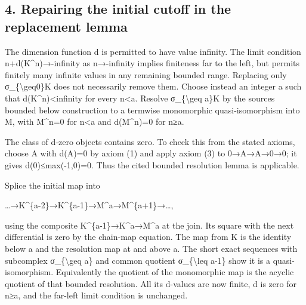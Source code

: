 \subsection{4. Repairing the initial cutoff in the replacement lemma}\label{proofs-9746-10132-repairing-the-initial-cutoff-in-the-replacement-lemma}

The dimension function d is permitted to have value infinity. The limit condition n\allowbreak{}+d(K\textasciicircum{}n)\allowbreak{}\allowbreak{}→-infinity as n\allowbreak{}→-infinity implies finiteness far to the left,\allowbreak{} but permits finitely many infinite values in any remaining bounded range. Replacing only σ\_\allowbreak{}\{\textbackslash{}geq0\}K does not necessarily remove them. Choose instead an integer a such that d(K\textasciicircum{}n)\allowbreak{}<infinity for every n\textless a. Resolve σ\_\allowbreak{}\{\textbackslash{}geq a\}K by the source\textquotesingle s bounded below construction to a termwise monomorphic quasi-isomorphism into M,\allowbreak{} with M\textasciicircum{}n\allowbreak{}=0 for n\textless a and d(M\textasciicircum{}n)\allowbreak{}\allowbreak{}=0 for n≥a.

The class of d-zero objects contains zero. To check this from the stated axioms,\allowbreak{} choose A with d(A)\allowbreak{}\allowbreak{}=0 by axiom (1)\allowbreak{} and apply axiom (3)\allowbreak{} to 0\allowbreak{}→A\allowbreak{}→A\allowbreak{}→0\allowbreak{}→0; it gives d(0)\allowbreak{}≤max(-1,\allowbreak{}0)\allowbreak{}\allowbreak{}=0. Thus the cited bounded resolution lemma is applicable.

Splice the initial map into

…\allowbreak{}→K\textasciicircum{}\{a-2\}\allowbreak{}→K\textasciicircum{}\{a-1\}\allowbreak{}→M\textasciicircum{}a\allowbreak{}→M\textasciicircum{}\{a\allowbreak{}+1\}\allowbreak{}→…,\allowbreak{}

using the composite K\textasciicircum{}\{a-1\}\allowbreak{}→K\textasciicircum{}a\allowbreak{}→M\textasciicircum{}a at the join. Its square with the next differential is zero by the chain-map equation. The map from K is the identity below a and the resolution map at and above a. The short exact sequences with subcomplex σ\_\allowbreak{}\{\textbackslash{}geq a\} and common quotient σ\_\allowbreak{}\{\textbackslash{}leq a-1\} show it is a quasi-isomorphism. Equivalently the quotient of the monomorphic map is the acyclic quotient of that bounded resolution. All its d-values are now finite,\allowbreak{} d is zero for n≥a,\allowbreak{} and the far-left limit condition is unchanged.

